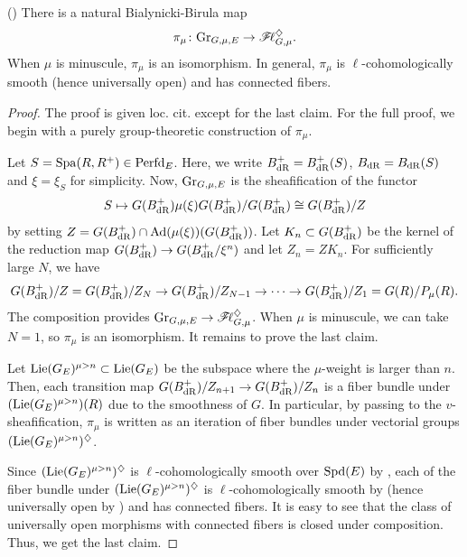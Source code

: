 \documentclass[12pt,reqno]{amsart}
\begin{document}
\begin{prop}\textup{(\cite[Proposition 19.4.2]{SW20})} \label{prop:BB_map}
    There is a natural Bialynicki-Birula map
    \[
        \pi_\mu \colon {\operatorname{Gr}}_{G, \mu, E} \to {\mathscr{F}\!\ell}_{G, \mu}^\diamondsuit.
    \]
    When $\mu$ is minuscule, $\pi_\mu$ is an isomorphism. In general, $\pi_\mu$ is $\ell$-cohomologically smooth (hence universally open) and has connected fibers. 
\end{prop}
\begin{proof}
    The proof is given loc. cit. except for the last claim. For the full proof, we begin with a purely group-theoretic construction of $\pi_\mu$. 
    
    Let $S = {\operatorname{Spa}}(R, R^+) \in {\operatorname{Perfd}}_E$. Here, we write $B^+_{\operatorname{dR}} = B^+_{\operatorname{dR}}(S)$, $B_{\operatorname{dR}} = B_{\operatorname{dR}}(S)$ and $\xi = \xi_S$ for simplicity. Now, ${\operatorname{Gr}}_{G, \mu, E}$ is the sheafification of the functor
    \[
        S \mapsto G(B^+_{\operatorname{dR}}) \mu(\xi) G(B^+_{\operatorname{dR}}) / G(B^+_{\operatorname{dR}}) \cong G(B^+_{\operatorname{dR}}) / Z
    \]
    by setting $Z = G(B^+_{\operatorname{dR}}) \cap {\operatorname{Ad}}(\mu(\xi))(G(B^+_{\operatorname{dR}}))$. Let $K_n \subset G(B^+_{\operatorname{dR}})$ be the kernel of the reduction map $G(B^+_{\operatorname{dR}}) \to G(B^+_{\operatorname{dR}} / \xi^n)$ and let $Z_n = Z K_n$. For sufficiently large $N$, we have 
    \[
        G(B^+_{\operatorname{dR}}) / Z = G(B^+_{\operatorname{dR}}) / Z_N \to G(B^+_{\operatorname{dR}}) / Z_{N-1} \to \cdots \to G(B^+_{\operatorname{dR}}) / Z_1 = G(R) / P_\mu(R). 
    \]
    The composition provides ${\operatorname{Gr}}_{G, \mu, E} \to {\mathscr{F}\!\ell}_{G, \mu}^\diamondsuit$. When $\mu$ is minuscule, we can take $N = 1$, so $\pi_\mu$ is an isomorphism. It remains to prove the last claim. 

    Let ${\operatorname{Lie}}(G_E)^{\mu > n} \subset {\operatorname{Lie}}(G_E)$ be the subspace where the $\mu$-weight is larger than $n$. Then, each transition map $G(B^+_{\operatorname{dR}}) / Z_{n + 1} \to G(B^+_{\operatorname{dR}}) / Z_n$ is a fiber bundle under $({\operatorname{Lie}}(G_E)^{\mu > n})(R)$ due to the smoothness of $G$. In particular, by passing to the $v$-sheafification, $\pi_\mu$ is written as an iteration of fiber bundles under vectorial groups $({\operatorname{Lie}}(G_E)^{\mu > n})^\diamondsuit$. 
    
    Since $({\operatorname{Lie}}(G_E)^{\mu > n})^\diamondsuit$ is $\ell$-cohomologically smooth over ${\operatorname{Spd}}(E)$ by \cite[Proposition 24.4]{Sch17}, each of the fiber bundle under $({\operatorname{Lie}}(G_E)^{\mu > n})^\diamondsuit$ is $\ell$-cohomologically smooth by \cite[Proposition 23.15]{Sch17} (hence universally open by \cite[Proposition 23.11]{Sch17}) and has connected fibers. It is easy to see that the class of universally open morphisms with connected fibers is closed under composition. Thus, we get the last claim.
\end{proof}
\end{document}

